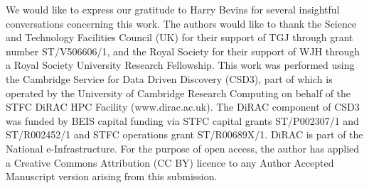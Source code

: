 \documentclass[twocolumn,english,aps,prd,amsmath,amssymb,reprint,floatfix,nofootinbib,showkeys]{revtex4-2}
\newif\ifhighlightchanges
\newcommand{\change}[1]{{\ifhighlightchanges\color{red} #1\else #1\fi}}
\begin{document}
\begin{acknowledgments}
We would like to express our gratitude to Harry Bevins for several insightful conversations concerning this work. 
The authors would like to thank the Science and Technology Facilities Council (UK) for their support of TGJ through grant number ST/V506606/1, and the Royal Society for their support of WJH  through a Royal Society University Research Fellowship. 
\change{This work was performed using the Cambridge Service for Data Driven Discovery (CSD3), part of which is operated by the University of Cambridge Research Computing on behalf of the STFC DiRAC HPC Facility (www.dirac.ac.uk). The DiRAC component of CSD3 was funded by BEIS capital funding via STFC capital grants ST/P002307/1 and ST/R002452/1 and STFC operations grant ST/R00689X/1. DiRAC is part of the National e-Infrastructure.}
For the purpose of open access, the author has applied a Creative Commons Attribution (CC BY) licence to any Author Accepted Manuscript version arising from this submission.
\end{acknowledgments}



\end{document}
